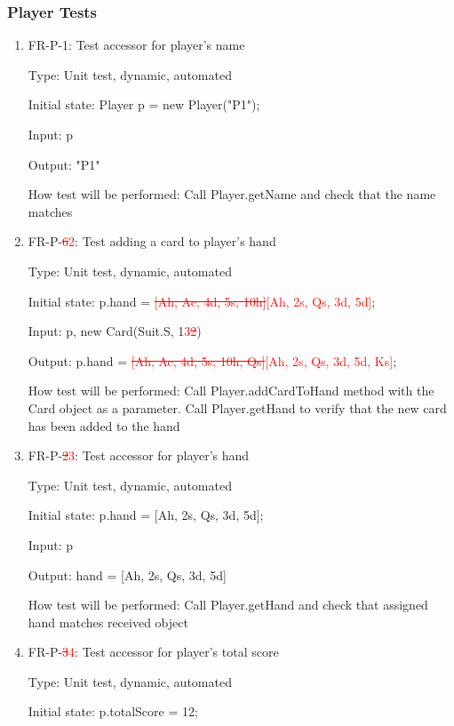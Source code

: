 \documentclass[12pt, titlepage]{article}
\begin{document}
\subsubsection{Player Tests}
\begin{enumerate}
    \item{FR-P-1: Test accessor for player's name}
    
    Type: Unit test, dynamic, automated
    					
    Initial state: Player p = new Player("P1");
    
    Input: p
    
    Output: "P1"
    
    How test will be performed: Call Player.getName and check that the name matches
    
    \item{FR-P-\textcolor{red}{\sout{6}2}: Test adding a card to player's hand}
    
    Type: Unit test, dynamic, automated
    					
    Initial state: p.hand = \textcolor{red}{\sout{[Ah, Ac, 4d, 5s, 10h]}[Ah, 2s, Qs, 3d, 5d]};
    
    Input: p, new Card(Suit.S, 1\textcolor{red}{3\sout{2}})
    
    Output: p.hand = \textcolor{red}{\sout{[Ah, Ac, 4d, 5s, 10h, Qs]}[Ah, 2s, Qs, 3d, 5d, Ks]};
    
    How test will be performed: Call Player.addCardToHand method with the Card object as a parameter. Call Player.getHand to verify that the new card has been added to the hand
    
    \item{FR-P-\textcolor{red}{\sout{2}3}: Test accessor for player's hand}
    
    Type: Unit test, dynamic, automated
    					
    Initial state: p.hand = [Ah, 2s, Qs, 3d, 5d];
    
    Input: p
    
    Output: hand = [Ah, 2s, Qs, 3d, 5d]
    
    How test will be performed: Call Player.getHand and check that assigned hand matches received object
    
    \item{FR-P-\textcolor{red}{\sout{3}4}: Test accessor for player's total score}
    
    Type: Unit test, dynamic, automated
    					
    Initial state: p.totalScore = 12;
    

\end{enumerate}
\end{document}
